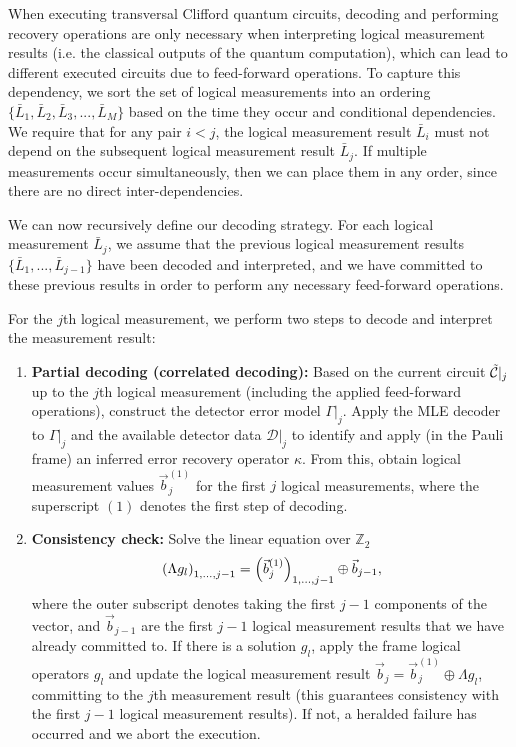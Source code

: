 When executing transversal Clifford quantum circuits, decoding and performing recovery operations are only necessary when interpreting logical measurement results (i.e. the classical outputs of the quantum computation), which can lead to different executed circuits due to feed-forward operations.
%
To capture this dependency, we sort the set of logical measurements into an ordering $\{\bar{L}_1, \bar{L}_2, \bar{L}_3,...,\bar{L}_M\}$ based on the time they occur and conditional dependencies.
%
We require that for any pair $i<j$, the logical measurement result $\bar{L}_i$ must not depend on the subsequent logical measurement result $\bar{L}_j$.
%
If multiple measurements occur simultaneously, then we can place them in any order, since there are no direct inter-dependencies.

We can now recursively define our decoding strategy.
%
For each logical measurement $\bar{L}_j$, we assume that the previous logical measurement results $\{\bar{L}_1,...,\bar{L}_{j-1}\}$ have been decoded and interpreted, and we have committed to these previous results in order to perform any necessary feed-forward operations.

\begin{definition}
\label{def:decoding_strategy}
For the $j$th logical measurement, we perform two steps to decode and interpret the measurement result:
\begin{enumerate}
\item \textbf{Partial decoding (correlated decoding):} Based on the current circuit $\tilde{\mathcal{C}}|_j$ up to the $j$th logical measurement (including the applied feed-forward operations), construct the detector error model $\Gamma|_j$. Apply the MLE decoder to $\Gamma|_j$ and the available detector data $\mathcal{D}|_j$ to identify and apply (in the Pauli frame) an inferred error recovery operator $\kappa$. From this, obtain logical measurement values $\vec{b}_j^{(1)}$ for the first $j$ logical measurements, where the superscript $(1)$ denotes the first step of decoding.
\item \textbf{Consistency check:} Solve the linear equation over $\mathbb{Z}_2$
\begin{align}
\qty(\Lambda g_l)_{1,...,j-1}= \left(\vec{b}_j^{(1)}\right)_{1,...,j-1}\oplus\vec{b}_{j-1},
\label{eq:consistency_equation}
\end{align}
where the outer subscript denotes taking the first $j-1$ components of the vector, and $\vec{b}_{j-1}$ are the first $j-1$ logical measurement results that we have already committed to.
%
If there is a solution $g_l$, apply the frame logical operators $g_l$ and update the logical measurement result $\vec{b}_j=\vec{b}_j^{(1)}\oplus \Lambda g_l$, committing to the $j$th measurement result (this guarantees consistency with the first $j-1$ logical measurement results).
%
If not, a heralded failure has occurred and we abort the execution.
\end{enumerate}
\end{definition}

